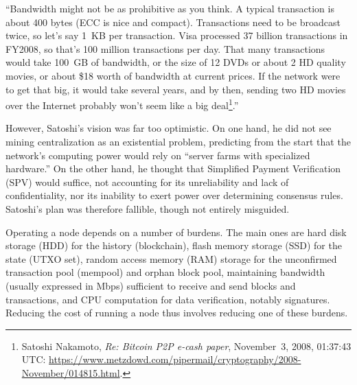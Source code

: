 \documentclass[
  a5paper,
  smalldemyvopaper,10pt,twoside,onecolumn,openright,extrafontsizes,hidelinks]{memoir}
\begin{document}
``Bandwidth might not be as prohibitive as you think. A typical
transaction is about 400 bytes (ECC is nice and compact). Transactions
need to be broadcast twice, so let's say 1~KB per transaction. Visa
processed 37 billion transactions in FY2008, so that's 100 million
transactions per day. That many transactions would take 100~GB of
bandwidth, or the size of 12 DVDs or about 2 HD quality movies, or about
\$18 worth of bandwidth at current prices. If the network were to get
that big, it would take several years, and by then, sending two HD
movies over the Internet probably won't seem like a big
deal\footnote{Satoshi Nakamoto, \emph{Re: Bitcoin P2P e-cash paper},
  November~3, 2008, 01:37:43 UTC:
  \url{https://www.metzdowd.com/pipermail/cryptography/2008-November/014815.html}.}.''

However, Satoshi's vision was far too optimistic. On one hand, he did
not see mining centralization as an existential problem, predicting from
the start that the network's computing power would rely on ``server
farms with specialized hardware.'' On the other hand, he thought that
Simplified Payment Verification (SPV) would suffice, not accounting for
its unreliability and lack of confidentiality, nor its inability to
exert power over determining consensus rules. Satoshi's plan was
therefore fallible, though not entirely misguided.

Operating a node depends on a number of burdens. The main ones are hard
disk storage (HDD) for the history (blockchain), flash memory storage
(SSD) for the state (UTXO set), random access memory (RAM) storage for
the unconfirmed transaction pool (mempool) and orphan block pool,
maintaining bandwidth (usually expressed in Mbps) sufficient to receive
and send blocks and transactions, and CPU computation for data
verification, notably signatures. Reducing the cost of running a node
thus involves reducing one of these burdens.
\end{document}
